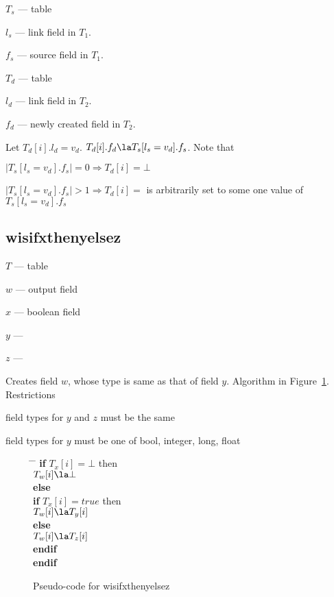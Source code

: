 \be
\item \(T_s\) --- table
\item \(l_s\) --- link field in \(T_1\). 
\item \(f_s\) --- source field in \(T_1\). 
\item \(T_d\) --- table
\item \(l_d\) --- link field in \(T_2\). 
\item \(f_d\) --- newly created field in \(T_2\). 
\ee

Let \(T_d[i].l_d = v_d\). \(T_d[i].f_d \la T_s[l_s = v_d].f_s\). Note
that
\be
\item \(|T_s[l_s = v_d].f_s| = 0 \Rightarrow T_d[i] = \bot\)
\item \(|T_s[l_s = v_d].f_s| > 1 \Rightarrow T_d[i] = \) is arbitrarily
set to some one value of \(T_s[l_s = v_d].f_s\)
\ee

\subsection{wisifxthenyelsez}
\label{wisifxthenyelsez}

\be
\item \(T\) --- table
\item \(w\) --- output field 
\item \(x\) --- boolean field 
\item \(y\) --- 
\item \(z\) --- 
\ee

Creates field \(w\), whose type is same as that of field \(y\).
Algorithm in Figure~\ref{pseudo_code_wisifxthenyelsez}. Restrictions
\be
\item field types for \(y\) and \(z\) must be the same
\item field types for \(y\) must be one of bool, integer, long, float
\ee

\begin{figure}
\centering
\begin{tabbing} \hspace*{0.25in} \=  \hspace*{0.25in} \= \kill
{\bf if} \(T_x[i] = \bot\) then \+ \\
  \(T_w[i] \la \bot \) \- \\
{\bf else} \+  \\
  {\bf if} \(T_x[i] = true\) then \+  \\
    \(T_w[i] \la T_y[i] \) \- \\
  {\bf else} \+  \\
    \(T_w[i] \la T_z[i] \) \- \\
  {\bf endif} \-  \\
{\bf endif} 
\end{tabbing}
\label{pseudo_code_wisifxthenyelsez}
\caption{Pseudo-code for wisifxthenyelsez}
\end{figure}


